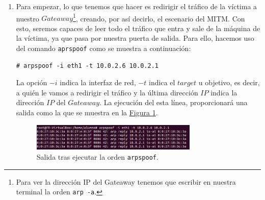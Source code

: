\documentclass[10pt,a4paper,spanish]{article}
\begin{document}
\begin{enumerate}
    \item Para empezar, lo que tenemos que hacer es redirigir el tráfico de la víctima a nuestro $Gateaway$\footnote{Para ver la dirección IP del Gateaway tenemos que escribir en nuestra terminal la orden \texttt{arp -a}.}, creando, por así decirlo, el escenario del MITM. Con esto, seremos capaces de leer todo el tráfico que entra y sale de la máquina de la víctima, ya que pasa por nuestra puerta de salida. Para ello, hacemos uso del comando \texttt{aprspoof} como se muestra a continuación:

\begin{verbatim}
# arpspoof -i eth1 -t 10.0.2.6 10.0.2.1
\end{verbatim}

    La opción $-i$ indica la interfaz de red, $-t$ indica el $target$ u objetivo, es decir, a quién le vamos a redirigir el tráfico y la última dirección $IP$ indica la dirección $IP$ del $Gateaway$. La ejecución del esta línea, proporcionará una salida como la que se muestra en la \hyperref[ataque1]{Figura \ref*{ataque1}}.

    \begin{figure}[!h]
        \centering
        \includegraphics[width=0.75\textwidth]{ataque1}
        \caption{Salida tras ejecutar la orden \texttt{arpspoof}.}
        \label{ataque1}
    \end{figure}


\end{enumerate}
\end{document}
